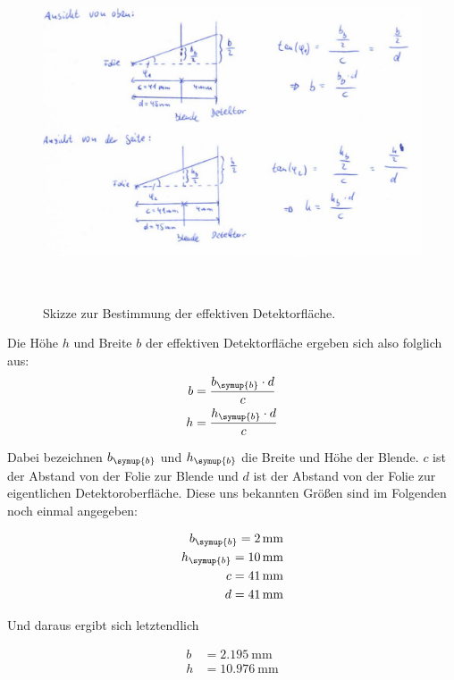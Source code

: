 \begin{figure}[H]
  \centering
  \includegraphics[height=10cm]{Skizze.PNG}
  \caption{Skizze zur Bestimmung der effektiven Detektorfläche.}
  \label{fig:skizze}
\end{figure}

Die Höhe $h$ und Breite $b$ der effektiven Detektorfläche ergeben sich also folglich
aus:
\begin{align*}
  b &= \frac{b_\symup{b} \cdot d}{c} \\
  h &= \frac{h_\symup{b} \cdot d}{c}
\end{align*}

Dabei bezeichnen $b_\symup{b}$ und $h_\symup{b}$ die Breite und Höhe der Blende.
$c$ ist der Abstand von der Folie zur Blende und $d$ ist der Abstand von der Folie
zur eigentlichen Detektoroberfläche. Diese uns bekannten Größen \cite{sample1} sind
im Folgenden noch einmal angegeben:

\begin{align*}
  b_\symup{b} = \SI{2}{\milli\meter} \\
  h_\symup{b} = \SI{10}{\milli\meter} \\
  c = \SI{41}{\milli\meter} \\
  d = \SI{41}{\milli\meter}
\end{align*}

Und daraus ergibt sich letztendlich

\begin{align*}
  b &= \SI{2.195}{\milli\meter} \\
  h &= \SI{10.976}{\milli\meter}
\end{align*}

